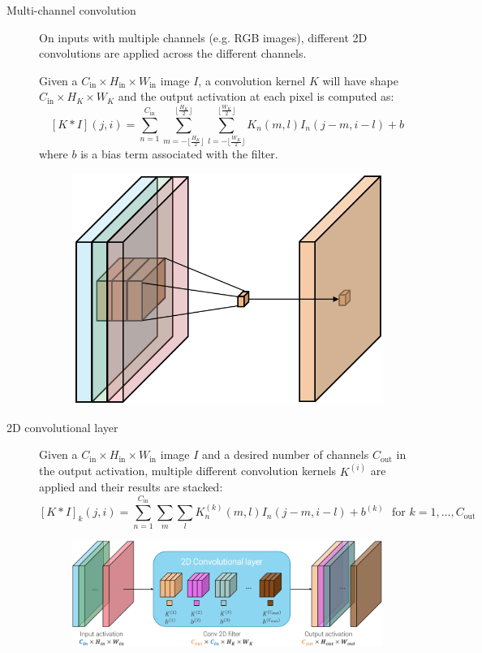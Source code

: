 \begin{description}
    \item[Multi-channel convolution] 
        On inputs with multiple channels (e.g. RGB images), different 2D convolutions are applied across the different channels.

        Given a $C_\text{in} \times H_\text{in} \times W_\text{in}$ image $I$, a convolution kernel $K$ will have shape $C_\text{in} \times H_K \times W_K$
        and the output activation at each pixel is computed as:
        \[ 
            [K * I](j, i) = 
                \sum_{n=1}^{C_\text{in}} 
                \sum_{m = -\lfloor \frac{H_K}{2} \rfloor}^{\lfloor \frac{H_K}{2} \rfloor} 
                \sum_{l = -\lfloor \frac{W_K}{2} \rfloor}^{\lfloor \frac{W_K}{2} \rfloor} 
                    K_n(m, l) I_n(j-m, i-l) + b
        \]
        where $b$ is a bias term associated with the filter.

        \begin{figure}[H]
            \centering
            \includegraphics[width=0.2\linewidth]{./img/2d_convolution.png}
        \end{figure}

    \item[2D convolutional layer] 
        Given a $C_\text{in} \times H_\text{in} \times W_\text{in}$ image $I$ and a desired number of channels $C_\text{out}$ in the output activation,
        multiple different convolution kernels $K^{(i)}$ are applied and their results are stacked:
        \[
            [K * I]_k(j, i) = \sum_{n=1}^{C_\text{in}} \sum_{m} \sum_{l} K_n^{(k)}(m, l) I_n(j-m, i-l) + b^{(k)} \,\,\text{ for $k=1, \dots, C_\text{out}$} 
        \]

        \begin{figure}[H]
            \centering
            \includegraphics[width=0.65\linewidth]{./img/2d_convolution_multi_out.png}
        \end{figure}


\end{description}
